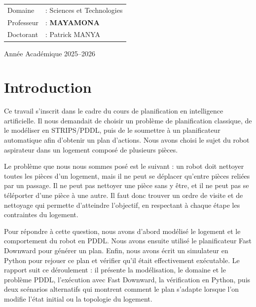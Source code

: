 \documentclass[a4paper, 11pt]{report}
\begin{document}
\begin{titlepage}
		\begin{flushleft}
			\vspace{0.5cm}
			\begin{tabular}{ll}
				Domaine    & : Sciences et Technologies \\
				Professeur & : \textbf{MAYAMONA} \\
				Doctorant & : Patrick MANYA \\
			\end{tabular}
		\end{flushleft}
		
		\vfill
		{\large Année Académique 2025--2026\par}
	\end{titlepage}
	
	\tableofcontents
	\newpage
	
	
	\section{Introduction}
	
	Ce travail s'inscrit dans le cadre du cours de planification en intelligence
	artificielle. Il nous demandait de choisir un problème de planification
	classique, de le modéliser en STRIPS/PDDL, puis de le soumettre à un
	planificateur automatique afin d'obtenir un plan d'actions. Nous avons choisi
	le sujet du robot aspirateur dans un logement composé de plusieurs pièces.
	
	Le problème que nous nous sommes posé est le suivant : un robot doit nettoyer
	toutes les pièces d'un logement, mais il ne peut se déplacer qu'entre pièces
	reliées par un passage. Il ne peut pas nettoyer une pièce sans y être, et il
	ne peut pas se téléporter d'une pièce à une autre. Il faut donc trouver un
	ordre de visite et de nettoyage qui permette d'atteindre l'objectif, en
	respectant à chaque étape les contraintes du logement.
	
	Pour répondre à cette question, nous avons d'abord modélisé le logement et le
	comportement du robot en PDDL. Nous avons ensuite utilisé le planificateur
	Fast Downward pour générer un plan. Enfin, nous avons écrit un simulateur en
	Python pour rejouer ce plan et vérifier qu'il était effectivement exécutable.
	Le rapport suit ce déroulement : il présente la modélisation, le domaine et
	le problème PDDL, l'exécution avec Fast Downward, la vérification en Python,
	puis deux scénarios alternatifs qui montrent comment le plan s'adapte lorsque
	l'on modifie l'état initial ou la topologie du logement.
	
\end{document}
